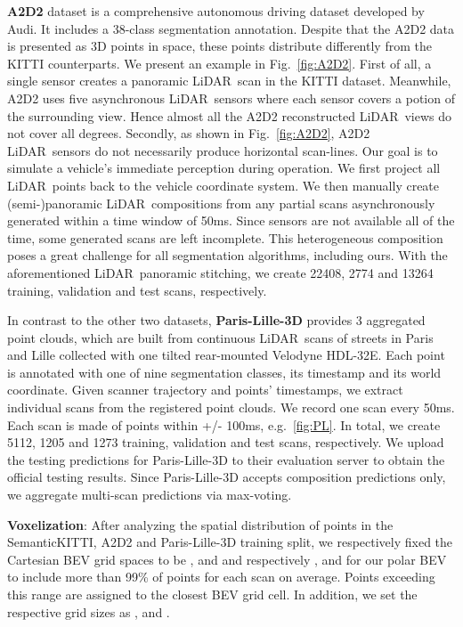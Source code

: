\documentclass[10pt,twocolumn,letterpaper]{article}
\newcommand{\lidar}{\mbox{LiDAR }}
\begin{document}
\textbf{A2D2} dataset is a comprehensive autonomous driving dataset developed by Audi. It includes  a 38-class segmentation annotation. Despite that the A2D2 data is presented as 3D points in space, these points distribute differently from the KITTI counterparts. We present an example in Fig.~\ref{fig:A2D2}. First of all, a single  sensor creates a  panoramic \lidar scan in the KITTI dataset. Meanwhile, A2D2 uses five asynchronous \lidar sensors where each sensor covers a potion of the surrounding view. Hence almost all the A2D2 reconstructed \lidar views do not cover all degrees. Secondly, as shown in Fig.~\ref{fig:A2D2}, A2D2 \lidar sensors do not necessarily produce horizontal scan-lines. Our goal is to simulate a vehicle's immediate perception during operation. We first project all \lidar points back to the vehicle coordinate system. We then manually create (semi-)panoramic \lidar compositions from any partial scans asynchronously generated within a time window of 50ms. Since sensors are not available all of the time, some generated scans are left incomplete. This heterogeneous composition poses a great challenge for all segmentation algorithms, including ours.  With the aforementioned \lidar panoramic stitching, we create 22408, 2774 and 13264 training, validation and test scans, respectively.

In contrast to the other two datasets, \textbf{Paris-Lille-3D} provides 3 aggregated point clouds, which are built from continuous \lidar scans of streets in Paris and Lille collected with one tilted rear-mounted Velodyne HDL-32E. Each point is annotated with one of nine segmentation classes, its timestamp and its world coordinate. Given scanner trajectory and points' timestamps, we extract individual scans from the registered point clouds. We record one scan every 50ms. Each scan is made of points within +/- 100ms, e.g.~\ref{fig:PL}. In total, we create 5112, 1205 and 1273 training, validation and test scans, respectively. We upload the testing predictions for Paris-Lille-3D to their evaluation server to obtain the official testing results. Since Paris-Lille-3D accepts composition predictions only, we aggregate multi-scan predictions via max-voting.

\textbf{Voxelization}: After analyzing the spatial distribution of points in the SemanticKITTI, A2D2 and Paris-Lille-3D training split, we respectively fixed the Cartesian BEV grid spaces to be ,  and  and respectively ,  and  for our polar BEV to include more than 99\% of points for each scan on average. Points exceeding this range are assigned to the closest BEV grid cell. In addition, we set the respective grid sizes as ,  and .
\end{document}
